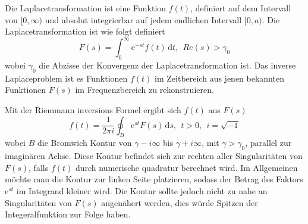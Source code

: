 \documentclass{scrartcl}
\begin{document}
Die Laplacetransformation ist eine Funktion $f(t)$, definiert auf dem Intervall von $[0, \infty)$ und absolut integrierbar auf jedem endlichen Intervall $[0, a)$. 
Die Laplacetransformation ist wie folgt definiert
\[
F(s) = \int_0^\infty \mathrm{e}^{-st}f(t)\,\mathrm{d}t,~~Re(s)>\gamma_{0}
\]
wobei $\gamma_{0}$ die Abzisse der Konvergenz der Laplacetransformation ist. 
Das inverse Laplaceproblem ist es Funktionen $f(t)$ im Zeitbereich aus jenen bekannten Funktionen $F(s)$ im Frequenzbereich zu rekonstruieren.

Mit der Riemmann inversions Formel ergibt sich $f(t)$ aus $F(s)$
\[
f(t) = \frac{1}{2\pi i} \oint_{B} \mathrm{e}^{st}F(s)\,\mathrm{d}s,~~t>0,~~i=\sqrt{-1}
\]
wobei $B$ die Bromwich Kontur von $\gamma-i\infty$ bis $\gamma+i\infty$, mit $\gamma>\gamma_{0}$, parallel zur imaginären Achse.
Diese Kontur befindet sich zur rechten aller Singularitäten von $F(s)$, falls $f(t)$ durch numerische quadratur berechnet wird.
Im Allgemeinen möchte man die Kontur zur linken Seite platzieren, sodass der Betrag des Faktors $\mathrm{e}^{st}$ im Integrand kleiner wird.
Die Kontur sollte jedoch nicht zu nahe an Singularitäten von $F(s)$ angenähert werden, dies würde Spitzen der Integeralfunktion zur Folge haben.
\end{document}
